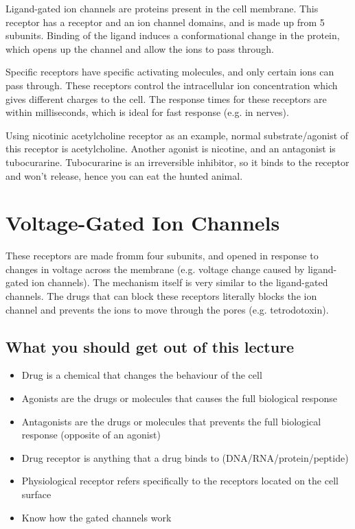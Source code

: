 \begin{center}
\end{center}

Ligand-gated ion channels are proteins present in the cell membrane.
This receptor has a receptor and an ion channel domains, and is made up from 5 subunits.
Binding of the ligand induces a conformational change in the protein, which opens up the channel and allow the ions to pass through.

Specific receptors have specific activating molecules, and only certain ions can pass through.
These receptors control the intracellular ion concentration which gives different charges to the cell.
The response times for these receptors are within milliseconds, which is ideal for fast response (e.g. in nerves).

Using nicotinic acetylcholine receptor as an example, normal substrate/agonist of this receptor is acetylcholine.
Another agonist is nicotine, and an antagonist is tubocurarine.
Tubocurarine is an irreversible inhibitor, so it binds to the receptor and won't release, hence you can eat the hunted animal.

\section{Voltage-Gated Ion Channels}

\begin{center}
\end{center}

These receptors are made fromm four subunits, and opened in response to changes in voltage across the membrane (e.g. voltage change caused by ligand-gated ion channels).
The mechanism itself is very similar to the ligand-gated channels.
The drugs that can block these receptors literally blocks the ion channel and prevents the ions to move through the pores (e.g. tetrodotoxin).

\subsection*{What you should get out of this lecture}

\begin{itemize}
	\item Drug is a chemical that changes the behaviour of the cell
	\item Agonists are the drugs or molecules that causes the full biological response
	\item Antagonists are the drugs or molecules that prevents the full biological response (opposite of an agonist)
	\item Drug receptor is anything that a drug binds to (DNA/RNA/protein/peptide)
	\item Physiological receptor refers specifically to the  receptors located on the cell surface
	\item Know how the gated channels work
\end{itemize}

